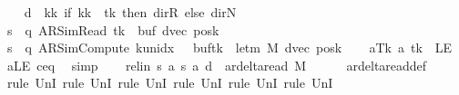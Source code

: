 \begin{isabellebody}
\ \ \isamarkupfalse%
\ {\isacharquery}{\kern0pt}d\ {\isacharequal}{\kern0pt}\ {\isachardoublequoteopen}{\isasymlambda}kk{\isachardot}{\kern0pt}\ if\ kk\ {\isacharequal}{\kern0pt}\ tk\ then\ dir{\isachardot}{\kern0pt}R\ else\ dir{\isachardot}{\kern0pt}N{\isachardoublequoteclose}\isanewline
\ \ \isamarkupfalse%
\ {\isacharquery}{\kern0pt}s\ {\isacharequal}{\kern0pt}\ {\isachardoublequoteopen}{\isacharparenleft}{\kern0pt}q{\isacharcomma}{\kern0pt}\ AR{\isacharunderscore}{\kern0pt}SimRead{\isacharcomma}{\kern0pt}\ tk{\isacharcomma}{\kern0pt}\ {}{\isacharcomma}{\kern0pt}\ buf{\isacharcomma}{\kern0pt}\ dvec{\isacharcomma}{\kern0pt}\ posk{\isacharparenright}{\kern0pt}{\isachardoublequoteclose}\isanewline
\ \ \isamarkupfalse%
\ {\isacharquery}{\kern0pt}s{\isacharprime}{\kern0pt}\ {\isacharequal}{\kern0pt}\ {\isachardoublequoteopen}{\isacharparenleft}{\kern0pt}q{\isacharcomma}{\kern0pt}\ AR{\isacharunderscore}{\kern0pt}SimCompute{\isacharcomma}{\kern0pt}\ k{\isacharunderscore}{\kern0pt}unidx\ {}{\isacharcomma}{\kern0pt}\ {}{\isacharcomma}{\kern0pt}\ buf{\isacharparenleft}{\kern0pt}tk\ {\isacharcolon}{\kern0pt}{\isacharequal}{\kern0pt}\ le{\isacharunderscore}{\kern0pt}tm\ M{\isacharparenright}{\kern0pt}{\isacharcomma}{\kern0pt}\ dvec{\isacharcomma}{\kern0pt}\ posk{\isacharparenright}{\kern0pt}{\isachardoublequoteclose}\isanewline
\ \ \isamarkupfalse%
\ aTk{\isacharcolon}{\kern0pt}\ {\isachardoublequoteopen}{\isacharquery}{\kern0pt}a\ tk\ {\isacharequal}{\kern0pt}\ LE{}{\isachardoublequoteclose}\ \isamarkupfalse%
\ aLE\ c{\isacharprime}{\kern0pt}{\isacharunderscore}{\kern0pt}eq\ \isamarkupfalse%
\ simp\isanewline
\ \ \isamarkupfalse%
\ rel{\isacharunderscore}{\kern0pt}in{\isacharcolon}{\kern0pt}\ {\isachardoublequoteopen}{\isacharparenleft}{\kern0pt}{\isacharquery}{\kern0pt}s{\isacharcomma}{\kern0pt}\ {\isacharquery}{\kern0pt}a{\isacharcomma}{\kern0pt}\ {\isacharquery}{\kern0pt}s{\isacharprime}{\kern0pt}{\isacharcomma}{\kern0pt}\ {\isacharquery}{\kern0pt}a{\isacharcomma}{\kern0pt}\ {\isacharquery}{\kern0pt}d{\isacharparenright}{\kern0pt}\ {\isasymin}\ ar{\isacharunderscore}{\kern0pt}delta{\isacharunderscore}{\kern0pt}read\ M{\isachardoublequoteclose}\isanewline
\ \ \ \ \isamarkupfalse%
\ ar{\isacharunderscore}{\kern0pt}delta{\isacharunderscore}{\kern0pt}read{\isacharunderscore}{\kern0pt}def\isanewline
\ \ \ \ \isamarkupfalse%
\ {\isacharparenleft}{\kern0pt}rule\ UnI{}{\isacharcomma}{\kern0pt}\ rule\ UnI{}{\isacharcomma}{\kern0pt}\ rule\ UnI{}{\isacharcomma}{\kern0pt}\ rule\ UnI{}{\isacharcomma}{\kern0pt}\ rule\ UnI{}{\isacharcomma}{\kern0pt}\ rule\ UnI{}{\isacharparenright}{\kern0pt}\isanewline

\end{isabellebody}
